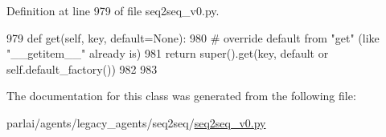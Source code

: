 Definition at line 979 of file seq2seq\+\_\+v0.\+py.


\begin{DoxyCode}
979     \textcolor{keyword}{def }get(self, key, default=None):
980         \textcolor{comment}{# override default from "get" (like "\_\_getitem\_\_" already is)}
981         \textcolor{keywordflow}{return} super().get(key, default \textcolor{keywordflow}{or} self.default\_factory())
982 
983 
\end{DoxyCode}


The documentation for this class was generated from the following file\+:\begin{DoxyCompactItemize}
\item 
parlai/agents/legacy\+\_\+agents/seq2seq/\hyperlink{seq2seq__v0_8py}{seq2seq\+\_\+v0.\+py}\end{DoxyCompactItemize}
